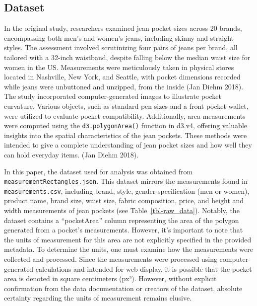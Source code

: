 \documentclass[
  letterpaper,
  DIV=11,
  numbers=noendperiod]{scrartcl}
\begin{document}
\hypertarget{dataset}{%
\subsection{Dataset}\label{dataset}}

In the original study, researchers examined jean pocket sizes across 20
brands, encompassing both men's and women's jeans, including skinny and
straight styles. The assessment involved scrutinizing four pairs of
jeans per brand, all tailored with a 32-inch waistband, despite falling
below the median waist size for women in the US. Measurements were
meticulously taken in physical stores located in Nashville, New York,
and Seattle, with pocket dimensions recorded while jeans were unbuttoned
and unzipped, from the inside (Jan Diehm 2018). The study incorporated
computer-generated images to illustrate pocket curvature. Various
objects, such as standard pen sizes and a front pocket wallet, were
utilized to evaluate pocket compatibility. Additionally, area
measurements were computed using the \texttt{d3.polygonArea()} function
in d3.v4, offering valuable insights into the spatial characteristics of
the jean pockets. These methods were intended to give a complete
understanding of jean pocket sizes and how well they can hold everyday
items. (Jan Diehm 2018).

In this paper, the dataset used for analysis was obtained from
\texttt{measurementRectangles.json}. This dataset mirrors the
measurements found in \texttt{measurements.csv}, including brand, style,
gender specification (men or women), product name, brand size, waist
size, fabric composition, price, and height and width measurements of
jean pockets (see Table~\ref{tbl-raw_data}). Notably, the dataset
contains a ``pocketArea'' column representing the area of the polygon
generated from a pocket's measurements. However, it's important to note
that the units of measurement for this area are not explicitly specified
in the provided metadata. To determine the units, one must examine how
the measurements were collected and processed. Since the measurements
were processed using computer-generated calculations and intended for
web display, it is possible that the pocket area is denoted in square
centimeters (px²). However, without explicit confirmation from the data
documentation or creators of the dataset, absolute certainty regarding
the units of measurement remains elusive.
\end{document}
